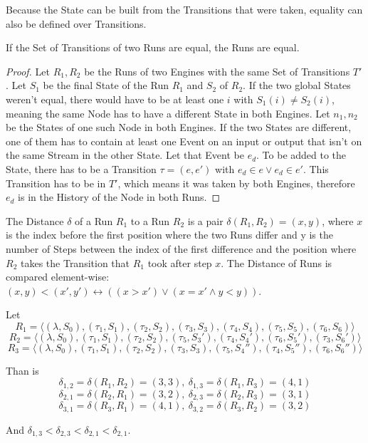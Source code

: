 Because the State can be built from the Transitions that were taken, equality can also be defined over Transitions.

\begin{lemma}[name = Equality of Runs over Transitions]\label{lemma:equal_runs_with_transitions}
  If the Set of Transitions of two Runs are equal, the Runs are equal.
\end{lemma}

\begin{proof}
  Let \(R_1, R_2\) be the Runs of two Engines with the same Set of Transitions \(T'\).
  Let \(S_1\) be the final State of the Run \(R_1\) and \(S_2\) of \(R_2\).
  If the two global States weren't equal, there would have to be at least one \(i\) with \(S_1(i) \neq S_2(i)\), meaning the same Node has to have a different State in both Engines.
  Let \(n_1, n_2\) be the States of one such Node in both Engines.
  If the two States are different, one of them has to contain at least one Event on an input or output that isn't on the same Stream in the other State.
  Let that Event be \(e_d\).
  To be added to the State, there has to be a Transition \(\tau = (e, e')\) with \(e_d \in e \lor e_d \in e'\).
  This Transition has to be in \(T'\), which means it was taken by both Engines, therefore \(e_d\) is in the History of the Node in both Runs.
\end{proof}

\begin{definition}[name = Distance of Runs]\label{def:runs_distance}
  The Distance \(\delta\) of a Run \(R_1\) to a Run \(R_2\) is a pair \(\delta(R_1,R_2) = (x,y)\), where \(x\) is the index before the first position where the two Runs differ and y is the number of Steps between the index of the first difference and the position where \(R_2\) takes the Transition that \(R_1\) took after step \(x\).
  The Distance of Runs is compared element-wise: \((x,y) < (x',y') \leftrightarrow ((x > x') \lor (x = x' \land y < y))\).
\end{definition}

\begin{exmp}
  Let
  \[R_1 = \langle (\lambda, S_0), (\tau_1,S_1), (\tau_2,S_2), (\tau_3,S_3), (\tau_4,S_4), (\tau_5,S_5), (\tau_6,S_6) \rangle\]
  \[R_2 = \langle (\lambda, S_0), (\tau_1,S_1), (\tau_2,S_2), (\tau_5,S_3'), (\tau_4,S_4'), (\tau_6,S_5'), (\tau_3,S_6') \rangle\]
  \[R_3 = \langle (\lambda, S_0), (\tau_1,S_1), (\tau_2,S_2), (\tau_3,S_3), (\tau_5,S_4''), (\tau_4,S_5''), (\tau_6,S_6'') \rangle\]

  Than is
  \[\delta_{1,2} = \delta(R_1,R_2) = (3,3),\ \delta_{1,3} = \delta(R_1,R_3) = (4,1)\]
  \[\delta_{2,1} = \delta(R_2,R_1) = (3,2),\ \delta_{2,3} = \delta(R_2,R_3) = (3,1)\]
  \[\delta_{3,1} = \delta(R_3,R_1) = (4,1),\ \delta_{3,2} = \delta(R_3,R_2) = (3,2)\]

  And \(\delta_{1,3} < \delta_{2,3} < \delta_{2,1} < \delta_{2,1}\).


\end{exmp}

